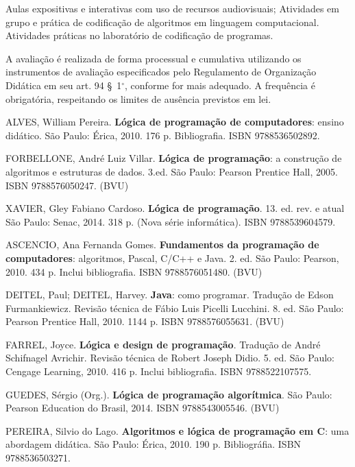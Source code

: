 \begin{pud}
	\metodologia            	
       Aulas expositivas e interativas com uso de recursos audiovisuais;
       Atividades em grupo e prática de codificação de algoritmos em linguagem computacional.
       Atividades práticas no laboratório de codificação de programas.
	
	
	\avaliacao	
	A avaliação é realizada de forma processual e cumulativa utilizando os instrumentos de avaliação especificados pelo Regulamento de Organização Didática em seu art. 94 \S~1$^\circ$, conforme for mais adequado. A frequência é obrigatória, respeitando os limites de ausência previstos em lei.
	
	\begin{bibbasica}
		\item ALVES, William Pereira. \textbf{Lógica de programação de computadores}: ensino didático. São Paulo: Érica, 2010. 176 p. Bibliografia. ISBN 9788536502892. 
		\item FORBELLONE, André Luiz Villar. \textbf{Lógica de programação}: a construção de algoritmos e estruturas de dados. 3.ed. São Paulo: Pearson Prentice Hall, 2005.  ISBN 9788576050247. (BVU)
	 	\item XAVIER, Gley Fabiano Cardoso. \textbf{Lógica de programação}. 13. ed. rev. e atual São Paulo: Senac, 2014. 318 p. (Nova série informática). ISBN 9788539604579.
	 	 
	\end{bibbasica}
	
	\begin{bibcomplementar}
	
		\item ASCENCIO, Ana Fernanda Gomes. \textbf{Fundamentos da programação de computadores}: algoritmos, Pascal, C/C++ e Java. 2. ed. São Paulo: Pearson, 2010. 434 p. Inclui bibliografia. ISBN 9788576051480.
 (BVU)
		\item DEITEL, Paul; DEITEL, Harvey. \textbf{Java}: como programar. Tradução de Edson Furmankiewicz. Revisão técnica de Fábio Luis Picelli Lucchini. 8. ed. São Paulo: Pearson Prentice Hall, 2010. 1144 p. ISBN 9788576055631. (BVU)
	    	

    	\item FARREL, Joyce. \textbf{Lógica e design de programação}. Tradução de André Schifnagel Avrichir. Revisão técnica de Robert Joseph Didio. 5. ed. São Paulo: Cengage Learning, 2010. 416 p. Inclui bibliografia. ISBN 9788522107575.
    	\item GUEDES, Sérgio (Org.). \textbf{Lógica de programação algorítmica}. São Paulo: Pearson Education do Brasil, 2014.  ISBN 9788543005546. (BVU)
    	\item PEREIRA, Silvio do Lago. \textbf{Algoritmos e lógica de programação em C}: uma abordagem didática. São Paulo: Érica, 2010. 190 p. Bibliográfia. ISBN 9788536503271.
		
	\end{bibcomplementar}
\end{pud}


